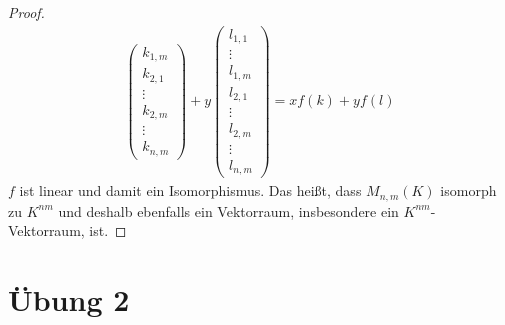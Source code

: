 \documentclass[a4paper,10pt]{article}
\begin{document}
\begin{proof}
\begin{align}
\begin{pmatrix}
       k_{1,m}\\
       k_{2,1}\\
       \vdots\\
       k_{2,m}\\
       \vdots\\
       k_{n,m}
      \end{pmatrix}
    + y\begin{pmatrix}
       l_{1,1}\\
       \vdots\\
       l_{1,m}\\
       l_{2,1}\\
       \vdots\\
       l_{2,m}\\
       \vdots\\
       l_{n,m}
      \end{pmatrix} = xf(k) + yf(l)
 \end{align}
 $f$ ist linear und damit ein Isomorphismus.
 Das heißt, dass $M_{n,m}(K)$ isomorph zu $K^{nm}$ und deshalb ebenfalls ein Vektorraum, insbesondere ein $K^{nm}$-Vektorraum, ist.
\end{proof}

\section*{Übung 2}
\end{document}
